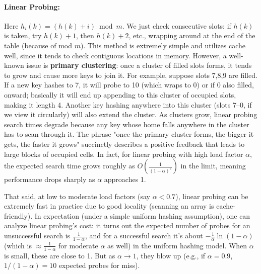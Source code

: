 \documentclass[11pt]{article}
\begin{document}
\paragraph{Linear Probing:} Here $h_{i}(k) = (h(k) + i) \bmod m$. We just check consecutive slots: if $h(k)$ is taken, try $h(k)+1$, then $h(k)+2$, etc., wrapping around at the end of the table (because of mod $m$). This method is extremely simple and utilizes cache well, since it tends to check contiguous locations in memory. However, a well-known issue is \textbf{primary clustering}: once a cluster of filled slots forms, it tends to grow and cause more keys to join it. For example, suppose slots 7,8,9 are filled. If a new key hashes to 7, it will probe to 10 (which wraps to 0) or if 0 also filled, onward; basically it will end up appending to this cluster of occupied slots, making it length 4. Another key hashing anywhere into this cluster (slots 7–0, if we view it circularly) will also extend the cluster. As clusters grow, linear probing search times degrade because any key whose home falls anywhere in the cluster has to scan through it. The phrase "once the primary cluster forms, the bigger it gets, the faster it grows" succinctly describes a positive feedback that leads to large blocks of occupied cells. In fact, for linear probing with high load factor $\alpha$, the expected search time grows roughly as $O\!\left(\frac{1}{(1-\alpha)^2}\right)$ in the limit, meaning performance drops sharply as $\alpha$ approaches 1.

That said, at low to moderate load factors (say $\alpha < 0.7$), linear probing can be extremely fast in practice due to good locality (scanning an array is cache-friendly). In expectation (under a simple uniform hashing assumption), one can analyze linear probing’s cost: it turns out the expected number of probes for an unsuccessful search is $\frac{1}{1-\alpha}$, and for a successful search it’s about $-\frac{1}{\alpha} \ln(1-\alpha)$ (which is $\approx \frac{1}{1-\alpha}$ for moderate $\alpha$ as well) in the uniform hashing model. When $\alpha$ is small, these are close to 1. But as $\alpha \to 1$, they blow up (e.g., if $\alpha=0.9$, $1/(1-\alpha) = 10$ expected probes for miss).
\end{document}
